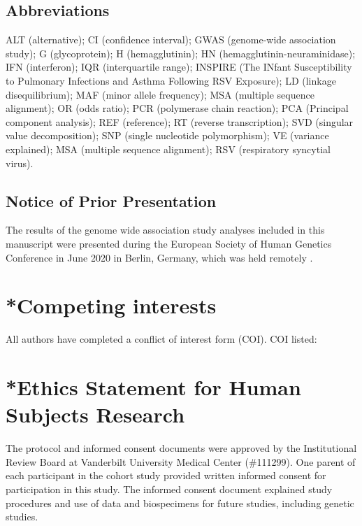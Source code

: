 \documentclass{article} %
\makeatletter
\renewcommand{\maketitle}{\bgroup\setlength{\parindent}{0pt}
\begin{flushleft}
  \textbf{\@title}

  \@author
\end{flushleft}\egroup
}
\makeatother
\begin{document}
\maketitle


\subsection*{Abbreviations}
ALT (alternative);
CI (confidence interval);
GWAS (genome-wide association study);
G (glycoprotein);
H (hemagglutinin);
HN (hemagglutinin-neuraminidase);
IFN (interferon);
IQR (interquartile range);
INSPIRE (The INfant Susceptibility to Pulmonary Infections and Asthma Following RSV Exposure);
LD (linkage disequilibrium);
MAF (minor allele frequency);
MSA (multiple sequence alignment);
OR (odds ratio);
PCR (polymerase chain reaction);
PCA (Principal component analysis);
REF (reference);
RT (reverse transcription);
SVD (singular value decomposition);
SNP (single nucleotide polymorphism);
VE (variance explained);
MSA (multiple sequence alignment);
RSV (respiratory syncytial virus).

\subsection*{Notice of Prior Presentation}
The results of the genome wide association study analyses included in this manuscript were presented during the European Society of Human Genetics Conference in June 2020 in Berlin, Germany, which was held remotely 
\citep{lawless2020genome}.

\section*{*Competing interests}
All authors have completed a conflict of interest form (COI). COI listed:

\section*{*Ethics Statement for Human Subjects Research}
The protocol and informed consent documents were approved by the Institutional Review Board at Vanderbilt University Medical Center (\#111299).  
One parent of each participant in the cohort study provided written informed consent for participation in this study. 
The informed consent document explained study procedures and use of data and biospecimens for future studies, including genetic studies.
\end{document}
